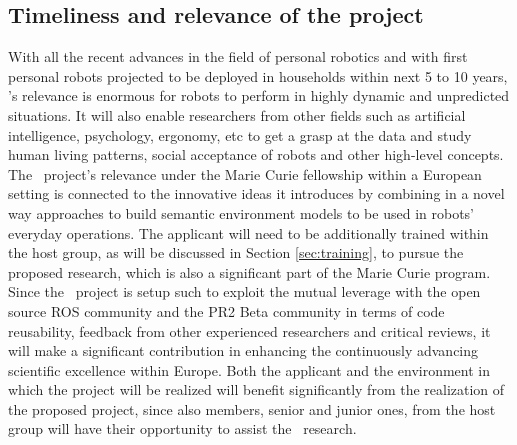 \subsection{Timeliness and relevance of the project}
With all the recent advances in the field of personal robotics and with first
personal robots projected to be deployed in households within next 5 to 10 years, 
\ksem's relevance is enormous for robots to perform in highly dynamic and unpredicted
situations. It will also enable researchers from other fields such as artificial intelligence, 
psychology, ergonomy, etc to get a grasp at the data and study human living patterns, 
social acceptance of robots and other high-level concepts.
The \ksem\ project's relevance under the Marie Curie fellowship within a European 
setting is connected to the innovative ideas it introduces by combining in a novel way 
approaches to build semantic environment models to be used in robots' everyday operations.
The applicant will need to be additionally trained within the host group, as will be discussed in Section 
\ref{sec:training}, to pursue the proposed research, which is also a significant part of the Marie Curie program.
Since the \ksem\ project is setup such to exploit the mutual leverage with the open source ROS 
community and the PR2 Beta community 
in terms of code reusability, feedback from other experienced researchers and critical reviews, 
it will make a significant contribution in enhancing the continuously advancing scientific excellence within Europe. 
Both the applicant and the  environment in which the project will be realized will benefit significantly from the 
realization of the proposed project, since also members, senior and junior ones, from the 
host group will have their opportunity to assist the \ksem\ research. \\

